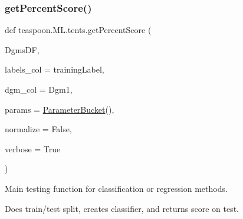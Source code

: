 \subsubsection{\texorpdfstring{get\+Percent\+Score()}{getPercentScore()}}
{\footnotesize\ttfamily def teaspoon.\+M\+L.\+tents.\+get\+Percent\+Score (\begin{DoxyParamCaption}\item[{}]{Dgms\+DF,  }\item[{}]{labels\+\_\+col = {\ttfamily \textquotesingle{}trainingLabel\textquotesingle{}},  }\item[{}]{dgm\+\_\+col = {\ttfamily \textquotesingle{}Dgm1\textquotesingle{}},  }\item[{}]{params = {\ttfamily \hyperlink{classteaspoon_1_1_m_l_1_1tents_1_1_parameter_bucket}{Parameter\+Bucket}()},  }\item[{}]{normalize = {\ttfamily False},  }\item[{}]{verbose = {\ttfamily True} }\end{DoxyParamCaption})}



Main testing function for classification or regression methods. 

Does train/test split, creates classifier, and returns score on test.


